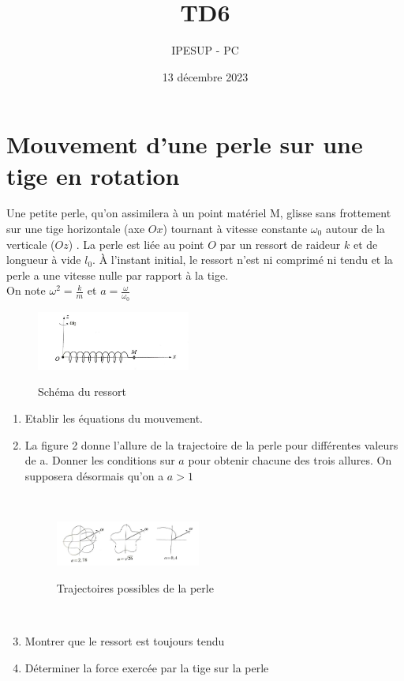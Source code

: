 \documentclass{article}
\title{TD6}
\author{IPESUP - PC }
\date{13 décembre 2023}
\begin{document}
\maketitle



\section{Mouvement d'une perle sur une tige en rotation}

Une petite perle, qu'on assimilera à un point matériel M, glisse sans frottement sur une tige horizontale (axe $Ox$) tournant à vitesse constante  $\omega _0$ autour de la verticale ($Oz$) . La perle est liée au
point $O$ par un ressort de raideur $k$ et de longueur à vide $l_0$. À l’instant initial,
le ressort n’est ni comprimé ni tendu et la perle a une vitesse nulle par rapport à la tige.
\\
On note $\omega ^2 = \frac{k}{m}$ et $a=\frac{\omega}{\omega _0}$


\begin{figure}[h]
  \centering
  \includegraphics[width=0.45\textwidth]{ressort.jpg}
  \label{fig:maison}
    \caption{Schéma du ressort}
\end{figure}


\begin{enumerate}
    \item Etablir les équations du mouvement. 
    \item La figure 2 donne l'allure de la trajectoire de la perle pour différentes valeurs de a. Donner les conditions sur $a$ pour obtenir chacune des trois allures. On supposera désormais qu'on a $a>1$ 

\\[0.1cm]

\begin{figure}[h]
  \centering
  \includegraphics[width=0.45\textwidth]{fleurs.jpg}
  \label{fig:maison}
    \caption{Trajectoires possibles de la perle}
\end{figure}

\\[0.1cm]


\item Montrer que le ressort est toujours tendu
\item Déterminer la force exercée par la tige sur la perle
    
\end{enumerate}
\end{document}
